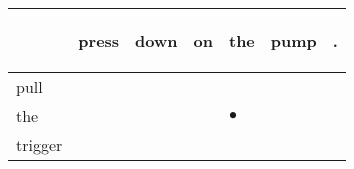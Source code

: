 \documentclass[landscape]{article}
\newcommand{\ssp}{\hspace{2pt}}
\newcommand{\mex}{\cellcolor{g}$\bullet$}
\begin{document}
\newpage

\noindent\begin{tabular}{|l|p{10pt}|p{10pt}|p{10pt}|p{10pt}|p{10pt}|p{10pt}|}
\hline
&\begin{sideways}\cellcolor{ref0}press\hspace{12pt}\end{sideways}&\begin{sideways}\cellcolor{ref1}down\hspace{12pt}\end{sideways}&\begin{sideways}\cellcolor{ref2}on\hspace{12pt}\end{sideways}&\begin{sideways}\cellcolor{ref3}the\hspace{12pt}\end{sideways}&\begin{sideways}\cellcolor{ref4}pump\hspace{12pt}\end{sideways}&\begin{sideways}\cellcolor{ref5}.\hspace{12pt}\end{sideways}\\
\hline
\ssp pull \ssp&\hspace{2pt}&\hspace{2pt}&\hspace{2pt}&\hspace{2pt}&\hspace{2pt}&\hspace{2pt}\\
\hline
\ssp \cellcolor{ref3}the \ssp&\hspace{2pt}&\hspace{2pt}&\hspace{2pt}&\hspace{2pt}\mex&\hspace{2pt}&\hspace{2pt}\\
\hline
\ssp trigger \ssp&\hspace{2pt}&\hspace{2pt}&\hspace{2pt}&\hspace{2pt}&\hspace{2pt}&\hspace{2pt}\\

\end{tabular}
\end{document}
